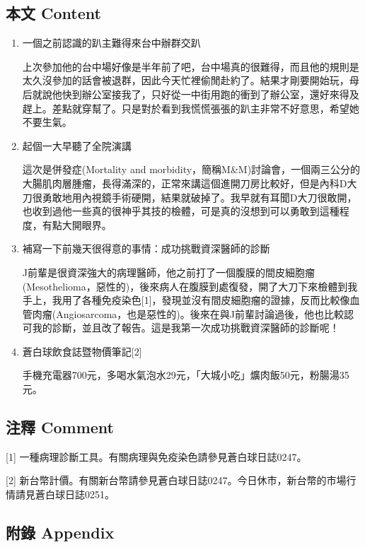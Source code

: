 \documentclass[a5paper, 11pt
]{book}
\begin{document}
\hypertarget{ux672cux6587-content-5}{%
\subsection{本文 Content}\label{ux672cux6587-content-5}}

\begin{enumerate}
\def\labelenumi{\arabic{enumi}.}
\item
  一個之前認識的趴主難得來台中辦群交趴

  上次參加他的台中場好像是半年前了吧，台中場真的很難得，而且他的規則是太久沒參加的話會被退群，因此今天忙裡偷閒赴約了。結果才剛要開始玩，母后就說他快到辦公室接我了，只好從一中街用跑的衝到了辦公室，還好來得及趕上。差點就穿幫了。只是對於看到我慌慌張張的趴主非常不好意思，希望她不要生氣。
\item
  起個一大早聽了全院演講

  這次是併發症(Mortality and
  morbidity，簡稱M\&M)討論會，一個兩三公分的大腸肌肉層腫瘤，長得滿深的，正常來講這個進開刀房比較好，但是內科D大刀很勇敢地用內視鏡手術硬開，結果就破掉了。我早就有耳聞D大刀很敢開，也收到過他一些真的很神乎其技的檢體，可是真的沒想到可以勇敢到這種程度，有點大開眼界。
\item
  補寫一下前幾天很得意的事情：成功挑戰資深醫師的診斷

  J前輩是很資深強大的病理醫師，他之前打了一個腹膜的間皮細胞瘤(Mesothelioma，惡性的)，後來病人在腹膜到處復發，開了大刀下來檢體到我手上，我用了各種免疫染色{[}1{]}，發現並沒有間皮細胞瘤的證據，反而比較像血管肉瘤(Angiosarcoma，也是惡性的)。後來在與J前輩討論過後，他也比較認可我的診斷，並且改了報告。這是我第一次成功挑戰資深醫師的診斷呢！
\item
  蒼白球飲食誌暨物價筆記{[}2{]}

  手機充電器700元，多喝水氣泡水29元，「大城小吃」爌肉飯50元，粉腸湯35元。
\end{enumerate}

\hypertarget{ux6ce8ux91cb-comment-5}{%
\subsection{注釋 Comment}\label{ux6ce8ux91cb-comment-5}}

{[}1{]} 一種病理診斷工具。有關病理與免疫染色請參見蒼白球日誌0247。

{[}2{]}
新台幣計價。有關新台幣請參見蒼白球日誌0247。今日休市，新台幣的市場行情請見蒼白球日誌0251。

\hypertarget{ux9644ux9304-appendix-5}{%
\subsection{附錄 Appendix}\label{ux9644ux9304-appendix-5}}
\end{document}
